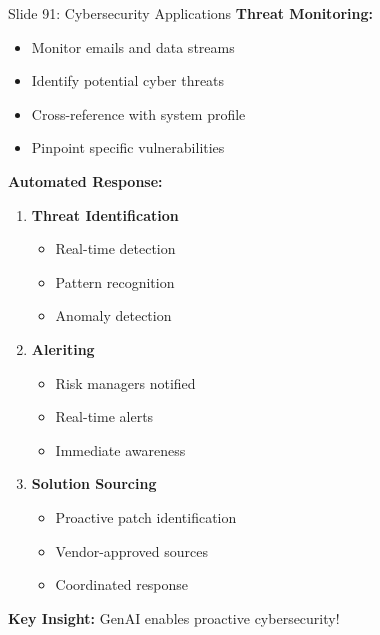 \documentclass[8pt]{beamer}
\begin{document}
	\begin{frame}{Slide 91: Cybersecurity Applications}
		\fontsize{6.5}{7.5}\selectfont
		\textbf{Threat Monitoring:}
		\begin{itemize}
			\item Monitor emails and data streams
			\item Identify potential cyber threats
			\item Cross-reference with system profile
			\item Pinpoint specific vulnerabilities
		\end{itemize}
		
		\vspace{0.1cm}
		\textbf{Automated Response:}
		\begin{enumerate}
			\item \textbf{Threat Identification}
			\begin{itemize}
				\item Real-time detection
				\item Pattern recognition
				\item Anomaly detection
			\end{itemize}
			\item \textbf{Aleriting}
			\begin{itemize}
				\item Risk managers notified
				\item Real-time alerts
				\item Immediate awareness
			\end{itemize}
			\item \textbf{Solution Sourcing}
			\begin{itemize}
				\item Proactive patch identification
				\item Vendor-approved sources
				\item Coordinated response
			\end{itemize}
		\end{enumerate}
		
		\textcolor{myblue}{\textbf{Key Insight:}} GenAI enables proactive cybersecurity!
	\end{frame}
	
\end{document}
